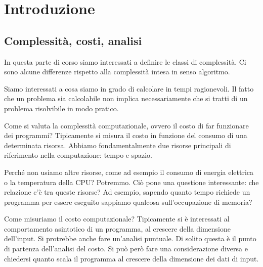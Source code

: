 %
%
%
%
\chapter{Introduzione}

\section{Complessità, costi, analisi}

In questa parte di corso siamo interessati a definire le classi di complessità. Ci sono alcune
differenze rispetto alla complessità intesa in senso algoritmo.

Siamo interessati a cosa siamo in grado di calcolare in tempi ragionevoli. Il fatto che un problema
sia calcolabile non implica necessariamente che si tratti di un problema risolvibile in modo
pratico.

Come si valuta la complessità computazionale, ovvero il costo di far funzionare dei programmi?
Tipicamente si misura il costo in funzione del consumo di una determinata risorsa. Abbiamo
fondamentalmente due risorse principali di riferimento nella computazione: tempo e spazio.

Perché non usiamo altre risorse, come ad esempio il consumo di energia elettrica o la temperatura
della CPU? Potremmo. Ciò pone una questione interessante: che relazione c'è tra queste risorse? Ad
esempio, sapendo quanto tempo richiede un programma per essere eseguito sappiamo qualcosa
sull'occupazione di memoria?%

Come misuriamo il costo computazionale? Tipicamente si è interessati al comportamento asintotico di
un programma, al crescere della dimensione dell'input. Si protrebbe anche fare un'analisi puntuale.
Di solito questa è il punto di partenza dell'analisi del costo. Si può però fare una considerazione
diversa e chiedersi quanto scala il programma al crescere della dimensione dei dati di input.

